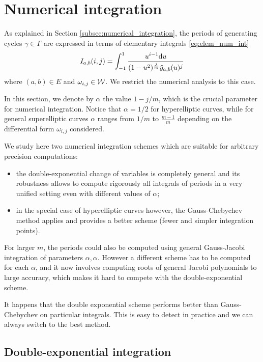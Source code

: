 \documentclass[main.tex]{subfiles}
\begin{document}
  \section{Numerical integration}\label{sec:numerical_integration}

As explained in Section \ref{subsec:numerical_integration}, the periods
of generating cycles $\gamma\in \Gamma$ are expressed in terms of
elementary integrals
\eqref{eq:elem_num_int}
\begin{equation*}
    I_{a,b}(i,j) = \int_{-1}^1\frac{u^{i-1}\mathrm d u}{(1-u^2)^{\frac jm}\tilde{y}_{a,b}(u)^j}
\end{equation*}
where $(a,b)\in E$ and $\omega_{i,j}\in\mathcal{W}$.
We restrict the numerical analysis to this case.

In this section, we denote by $α$ the value $1-j/m$, which is the crucial parameter for numerical integration.
Notice that $α=1/2$ for hyperelliptic curves, while for general superelliptic curves $α$ ranges
from $1/m$ to $\frac{m-1}m$ depending on the differential form $\omega_{i,j}$ considered.

We study here two numerical integration schemes which are suitable for arbitrary
precision computations:
\begin{itemize}
    \item 
        the double-exponential change of variables is completely general \cite{Molin2010} and its robustness
allows to compute rigorously all integrals of periods in a very unified setting
even with different values of $\alpha$;
\item in the special case of hyperelliptic curves however,
    the Gauss-Chebychev method \cite[25.4.38]{AbramowitzStegun} applies and
    provides a better scheme (fewer and simpler integration points).
\end{itemize}
For larger $m$, the periods could also be computed using general Gauss-Jacobi integration
of parameters $\alpha,\alpha$. However a different scheme has to be computed for each $\alpha$,
and it now involves computing roots of general Jacobi polynomials to large accuracy, which
makes it hard to compete with the double-exponential scheme.

\begin{rmk}
    It happens that the double exponential scheme performs better than Gauss-Chebychev on
    particular integrals. This is easy to detect in practice and we can always switch to
    the best method.
\end{rmk}

\subsection{Double-exponential integration}\label{sec:de_int}
\end{document}
